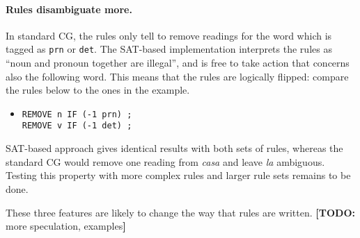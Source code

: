 \documentclass[11pt]{article}
\newcommand{\todo}[1]{{\color{cyan}\textbf{[TODO: }#1\textbf{]}}}
\begin{document}
\paragraph{Rules disambiguate more.}
In standard CG, the rules only tell to remove readings for the word which is tagged as 
\texttt{prn} or \texttt{det}. The SAT-based implementation interprets the rules as ``noun and pronoun together are illegal'', and is free to take action that concerns also the following word.
This means that the rules are logically flipped: compare the rules below to the ones in the example.

\begin{itemize}
\item [] \texttt{REMOVE n IF (-1 prn) ;} \\
             \texttt{REMOVE v IF (-1 det) ;}
\end{itemize}

SAT-based approach gives identical results with both sets of rules,
whereas the standard CG would remove one reading from \emph{casa} and leave \emph{la} ambiguous.
Testing this property with more complex rules and larger rule sets remains to be done.



These three features are likely to change the way that rules are written. \todo{more speculation, examples}
\end{document}
